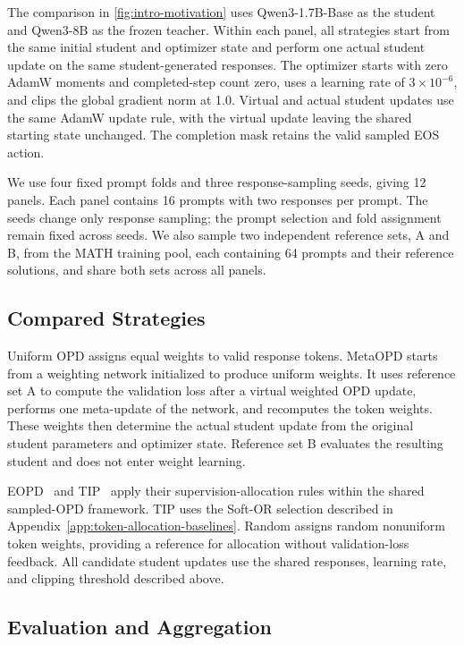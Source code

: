 \documentclass{article}
\theoremstyle{plain}
\theoremstyle{definition}
\theoremstyle{remark}
\begin{document}
The comparison in \cref{fig:intro-motivation} uses Qwen3-1.7B-Base as the student and Qwen3-8B as the frozen teacher. Within each panel, all strategies start from the same initial student and optimizer state and perform one actual student update on the same student-generated responses. The optimizer starts with zero AdamW moments and completed-step count zero, uses a learning rate of \(3\times10^{-6}\), and clips the global gradient norm at 1.0. Virtual and actual student updates use the same AdamW update rule, with the virtual update leaving the shared starting state unchanged. The completion mask retains the valid sampled EOS action.

We use four fixed prompt folds and three response-sampling seeds, giving 12 panels. Each panel contains 16 prompts with two responses per prompt. The seeds change only response sampling; the prompt selection and fold assignment remain fixed across seeds. We also sample two independent reference sets, A and B, from the MATH training pool, each containing 64 prompts and their reference solutions, and share both sets across all panels.

\subsection{Compared Strategies}

Uniform OPD assigns equal weights to valid response tokens. MetaOPD starts from a weighting network initialized to produce uniform weights. It uses reference set A to compute the validation loss after a virtual weighted OPD update, performs one meta-update of the network, and recomputes the token weights. These weights then determine the actual student update from the original student parameters and optimizer state. Reference set B evaluates the resulting student and does not enter weight learning.

EOPD~\citep{jin2026entropy} and TIP~\citep{xu2026tip} apply their supervision-allocation rules within the shared sampled-OPD framework. TIP uses the Soft-OR selection described in Appendix~\ref{app:token-allocation-baselines}. Random assigns random nonuniform token weights, providing a reference for allocation without validation-loss feedback. All candidate student updates use the shared responses, learning rate, and clipping threshold described above.



\subsection{Evaluation and Aggregation}
\end{document}
